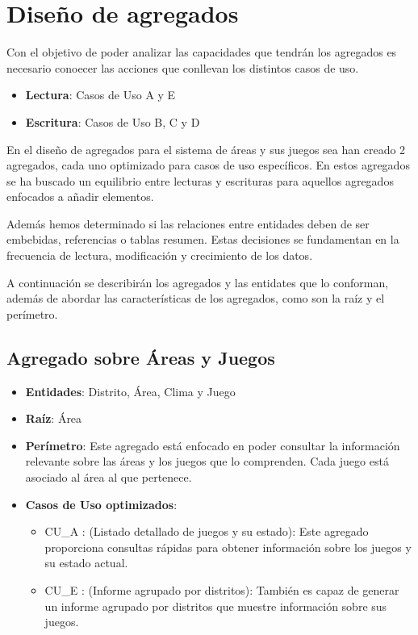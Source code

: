 \documentclass[]{article}
\begin{document}
\section{Diseño de agregados}
\label{sec:agregados}
Con el objetivo de poder analizar las capacidades que tendrán los agregados es necesario conoecer las acciones que conllevan los distintos casos de uso.
\begin{itemize}
    \item \textbf{Lectura}: Casos de Uso A y E
    \item \textbf{Escritura}: Casos de Uso B, C y D
\end{itemize}

En el diseño de agregados para el sistema de áreas y sus juegos sea han creado 2 agregados, cada uno optimizado para casos de uso específicos. En estos agregados se ha buscado un equilibrio entre lecturas y escrituras para aquellos agregados enfocados a añadir elementos.

Además hemos determinado si las relaciones entre entidades deben de ser embebidas, referencias o tablas resumen. Estas decisiones se fundamentan en la frecuencia de lectura, modificación y crecimiento de los datos.

A continuación se describirán los agregados y las entidates que lo conforman, además de abordar las características de los agregados, como son la raíz y el perímetro.

\subsection{Agregado sobre Áreas y Juegos}
\label{sub_sec:agregado_area_juego}
\begin{itemize}
    \item \textbf{Entidades}: Distrito, Área, Clima y Juego
    \item \textbf{Raíz}: Área
    \item \textbf{Perímetro}: Este agregado está enfocado en poder consultar la información relevante sobre las áreas y los juegos que lo comprenden. Cada juego está asociado al área al que pertenece.
    \item \textbf{Casos de Uso optimizados}:
    \begin{itemize}
        \item CU\_A : (Listado detallado de juegos y su estado): Este agregado proporciona consultas rápidas para obtener información sobre los juegos y su estado actual.
        \item CU\_E : (Informe agrupado por distritos): También es capaz de generar un informe agrupado por distritos que muestre información sobre sus juegos. 
    \end{itemize}
\end{itemize}
\end{document}
